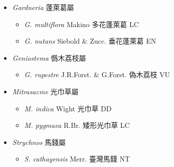 
  \begin{itemize}
 \item[] \textit{Gardneria} 蓬萊葛屬
                                
  \begin{itemize}
        \item[] \textit{G. multiflora} Makino  多花蓬萊葛   LC
        \item[] \textit{G. nutans} Siebold \& Zucc.  垂花蓬萊葛   EN
  \end{itemize}
 \item[] \textit{Geniostema} 僞木荔枝屬
                                
  \begin{itemize}
        \item[] \textit{G. rupestre} J.R.Forst. \& G.Forst.  偽木荔枝   VU
  \end{itemize}
 \item[] \textit{Mitrasacme} 光巾草屬
                                
  \begin{itemize}
        \item[] \textit{M. indica} Wight  光巾草   DD
        \item[] \textit{M. pygmaea} R.Br.  矮形光巾草   LC
  \end{itemize}
 \item[] \textit{Strychnos} 馬錢屬
                                
  \begin{itemize}
        \item[] \textit{S. cathayensis} Merr.  臺灣馬錢   NT
  \end{itemize}
  \end{itemize}
